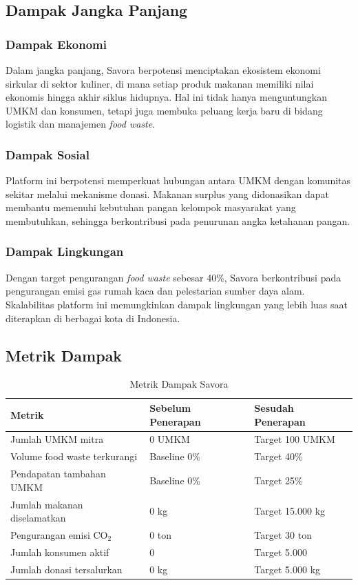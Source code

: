 \subsection{Dampak Jangka Panjang}

\subsubsection{Dampak Ekonomi}
Dalam jangka panjang, Savora berpotensi menciptakan ekosistem ekonomi sirkular di sektor kuliner, di mana setiap produk makanan memiliki nilai ekonomis hingga akhir siklus hidupnya. Hal ini tidak hanya menguntungkan UMKM dan konsumen, tetapi juga membuka peluang kerja baru di bidang logistik dan manajemen \textit{food waste}.

\subsubsection{Dampak Sosial}
Platform ini berpotensi memperkuat hubungan antara UMKM dengan komunitas sekitar melalui mekanisme donasi. Makanan surplus yang didonasikan dapat membantu memenuhi kebutuhan pangan kelompok masyarakat yang membutuhkan, sehingga berkontribusi pada penurunan angka ketahanan pangan.

\subsubsection{Dampak Lingkungan}
Dengan target pengurangan \textit{food waste} sebesar 40\%, Savora berkontribusi pada pengurangan emisi gas rumah kaca dan pelestarian sumber daya alam. Skalabilitas platform ini memungkinkan dampak lingkungan yang lebih luas saat diterapkan di berbagai kota di Indonesia.

\subsection{Metrik Dampak}

\begin{table}[htbp]
\centering
\caption{Metrik Dampak Savora}
\label{tab:metrik_dampak}
\begin{tabularx}{\textwidth}{|l|X|X|}
\hline
\textbf{Metrik} & \textbf{Sebelum Penerapan} & \textbf{Sesudah Penerapan} \\
\hline
Jumlah UMKM mitra & 0 UMKM & Target 100 UMKM \\
\hline
Volume food waste terkurangi & Baseline 0\% & Target 40\% \\
\hline
Pendapatan tambahan UMKM & Baseline 0\% & Target 25\% \\
\hline
Jumlah makanan diselamatkan & 0 kg & Target 15.000 kg \\
\hline
Pengurangan emisi CO$_2$ & 0 ton & Target 30 ton \\
\hline
Jumlah konsumen aktif & 0 & Target 5.000 \\
\hline
Jumlah donasi tersalurkan & 0 kg & Target 5.000 kg \\
\hline
\end{tabularx}
\end{table}
